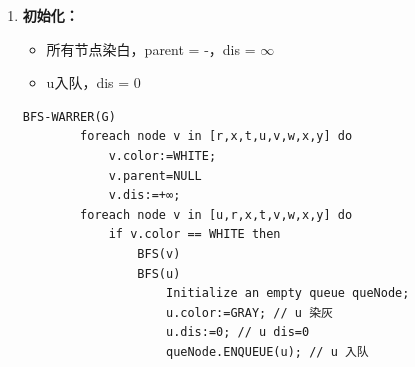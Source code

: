 \documentclass{article}
\begin{document}
\begin{enumerate}

    \item \textbf{初始化：}

    \begin{itemize}
        \item 所有节点染白，parent = -，dis = $\infty$
        \item u入队，dis = 0
    \end{itemize}

    \begin{lstlisting}[style=algorithmPPT]
        BFS-WARRER(G)
        foreach node v in [r,x,t,u,v,w,x,y] do
            v.color:=WHITE; 
            v.parent=NULL 
            v.dis:=+∞;
        foreach node v in [u,r,x,t,v,w,x,y] do
            if v.color == WHITE then
                BFS(v)
                BFS(u)
                    Initialize an empty queue queNode;
                    u.color:=GRAY; // u 染灰
                    u.dis:=0; // u dis=0
                    queNode.ENQUEUE(u); // u 入队
                \end{lstlisting}

    \begin{figure}[htbp]
        \begin{minipage}[b]{0.6\textwidth}    %
            \centering
\end{minipage}
\end{figure}
\end{enumerate}
\end{document}
